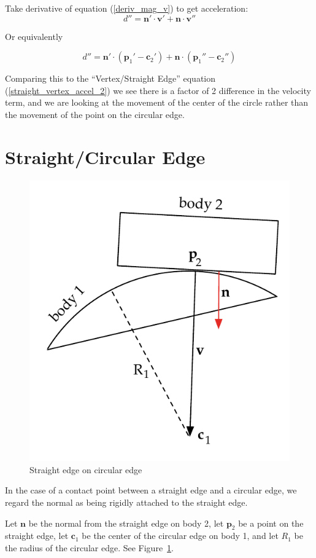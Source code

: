 \documentclass[final]{article}
\begin{document}
Take derivative of equation (\ref{deriv_mag_v}) to get acceleration:
\[
  d'' = \mathbf{n}' \cdot \mathbf{v}' + \mathbf{n} \cdot \mathbf{v}''
\]

Or equivalently

\begin{equation}\label{accel_vertex_circle}
  d'' = \mathbf{n}' \cdot (\mathbf{p}_1' - \mathbf{c}_2')
    + \mathbf{n} \cdot (\mathbf{p}_1'' - \mathbf{c}_2'')
\end{equation}

Comparing this to the ``Vertex/Straight Edge'' equation (\ref{straight_vertex_accel_2})
we see there is a factor of 2 difference in the velocity term, and we are looking at the
movement of the center of the circle rather than the movement of the point on the
circular edge.



\section{Straight/Circular Edge}

\begin{figure}[ht]
    \centering
    \includegraphics[width=0.45 \textwidth]{CEP_straight_circle_edge.pdf}
    \caption{Straight edge on circular edge}
    \label{fig:straight_circle_edge}
\end{figure}

In the case of a contact point between a straight edge and a circular edge, we regard
the normal as being rigidly attached to the straight edge.

Let $\mathbf{n}$ be the normal from the straight edge on body 2, let $\mathbf{p}_2$ be a
point on the straight edge, let $\mathbf{c}_1$ be the center of the circular edge on
body 1, and let $R_1$ be the radius of the circular edge. See
Figure~\ref{fig:straight_circle_edge}.
\end{document}
